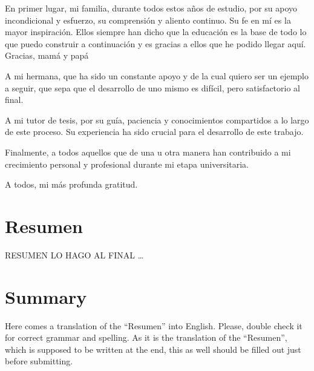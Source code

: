 \documentclass[a4paper, 12pt]{book}
\begin{document}
En primer lugar, mi familia, durante todos estos años de estudio, por su apoyo incondicional y esfuerzo, su comprensión y aliento continuo. Su fe en mí es la mayor inspiración. Ellos siempre han dicho que la educación es la base de todo lo que puedo construir a continuación y es gracias a ellos que he podido llegar aquí. Gracias, mamá y papá

A mi hermana, que ha sido un constante apoyo y de la cual quiero ser un ejemplo a seguir, que sepa que el desarrollo de uno mismo es difícil, pero satisfactorio al final.

A mi tutor de tesis, por su guía, paciencia y conocimientos compartidos a lo largo de este proceso. Su experiencia ha sido crucial para el desarrollo de este trabajo.

Finalmente, a todos aquellos que de una u otra manera han contribuido a mi crecimiento personal y profesional durante mi etapa universitaria.

A todos, mi más profunda gratitud.



\chapter*{Resumen}

RESUMEN LO HAGO AL FINAL \dots




\chapter*{Summary}

Here comes a translation of the ``Resumen'' into English. 
Please, double check it for correct grammar and spelling.
As it is the translation of the ``Resumen'', which is supposed to be written at the end, this as well should be filled out just before submitting.


\end{document}
